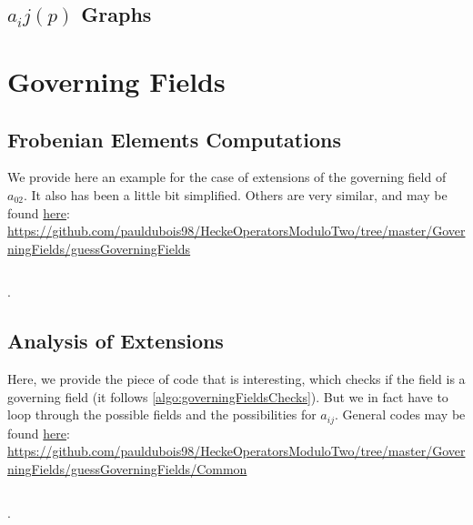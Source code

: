 \subsection{$a_ij(p)$ Graphs}




\section{Governing Fields}
\subsection{Frobenian Elements Computations}
\label{code:frobenianElementsCalc}
We provide here an example for the case of extensions of the governing field of $a_{02}$.
It also has been a little bit simplified.
Others are very similar, and may be found \href{https://github.com/pauldubois98/HeckeOperatorsModuloTwo/tree/master/GoverningFields/guessGoverningFields}{here}: \url{https://github.com/pauldubois98/HeckeOperatorsModuloTwo/tree/master/GoverningFields/guessGoverningFields}
\inputminted[breaklines]{C}{Codes/frobenianComputations.gp}.

\subsection{Analysis of Extensions}
\label{code:governingFieldsChecks}
Here, we provide the piece of code that is interesting, which checks if the field is a governing field (it follows \ref{algo:governingFieldsChecks}).
But we in fact have to loop through the possible fields and the possibilities for $a_{ij}$.
General codes may be found \href{https://github.com/pauldubois98/HeckeOperatorsModuloTwo/tree/master/GoverningFields/guessGoverningFields/Common}{here}: \url{https://github.com/pauldubois98/HeckeOperatorsModuloTwo/tree/master/GoverningFields/guessGoverningFields/Common}
\inputminted[breaklines]{Python}{Codes/governingFieldTest.py}.




